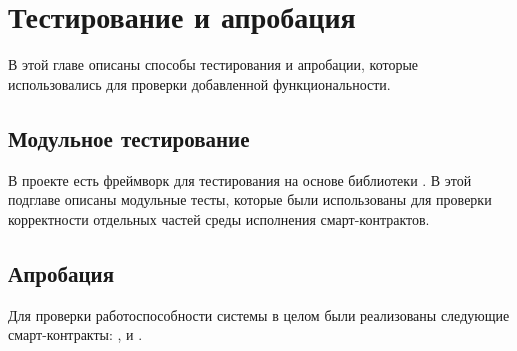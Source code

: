 \section{Тестирование и апробация}
В этой главе описаны способы тестирования и апробации, которые использовались для проверки добавленной функциональности.

\subsection{Модульное тестирование}
В проекте  есть фреймворк для тестирования на основе библиотеки .
В этой подглаве описаны модульные тесты, которые были использованы для проверки корректности отдельных частей среды исполнения смарт-контрактов.

\subsection{Апробация}
Для проверки работоспособности системы в целом были реализованы следующие смарт-контракты: ,  и . 
\subsubsection{}
\subsubsection{}
\subsubsection{}

